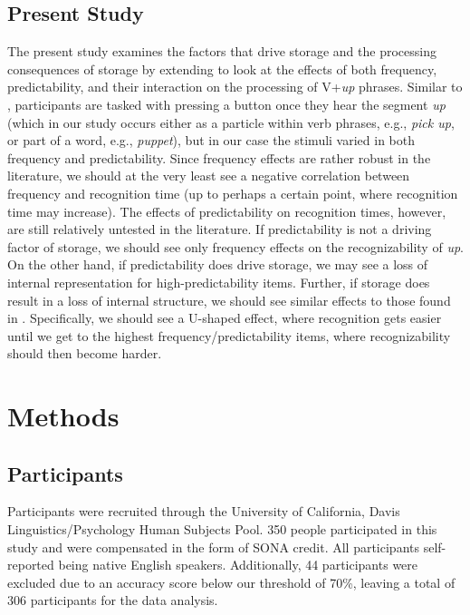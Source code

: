 \documentclass[
  authoryear,
  preprint,
  1p,
  onecolumn]{elsarticle}
\begin{document}
\subsection{Present Study}\label{present-study}

The present study examines the factors that drive storage and the
processing consequences of storage by extending \citet{kapatsinski2009}
to look at the effects of both frequency, predictability, and their
interaction on the processing of V+\emph{up} phrases. Similar to
\citet{kapatsinski2009}, participants are tasked with pressing a button
once they hear the segment \emph{up} (which in our study occurs either
as a particle within verb phrases, e.g., \emph{pick up}, or part of a
word, e.g., \emph{puppet}), but in our case the stimuli varied in both
frequency and predictability. Since frequency effects are rather robust
in the literature, we should at the very least see a negative
correlation between frequency and recognition time (up to perhaps a
certain point, where recognition time may increase). The effects of
predictability on recognition times, however, are still relatively
untested in the literature. If predictability is not a driving factor of
storage, we should see only frequency effects on the recognizability of
\emph{up}. On the other hand, if predictability does drive storage, we
may see a loss of internal representation for high-predictability items.
Further, if storage does result in a loss of internal structure, we
should see similar effects to those found in \citet{kapatsinski2009}.
Specifically, we should see a U-shaped effect, where recognition gets
easier until we get to the highest frequency/predictability items, where
recognizability should then become harder.

\section{Methods}\label{methods}

\subsection{Participants}\label{participants}

Participants were recruited through the University of California, Davis
Linguistics/Psychology Human Subjects Pool. 350 people participated in
this study and were compensated in the form of SONA credit. All
participants self-reported being native English speakers. Additionally,
44 participants were excluded due to an accuracy score below our
threshold of 70\%, leaving a total of 306 participants for the data
analysis.
\end{document}
